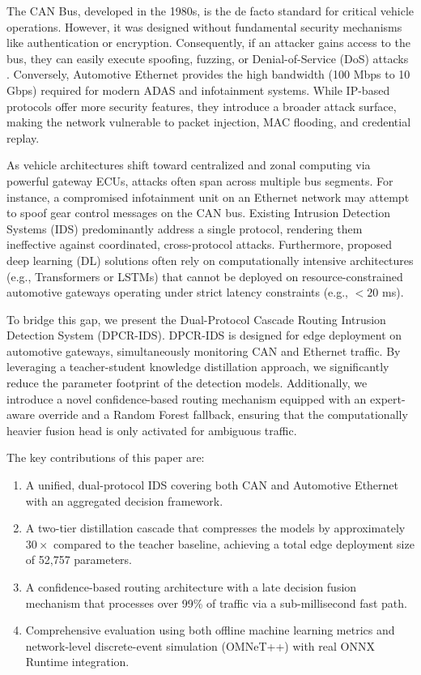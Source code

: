 \documentclass[conference]{IEEEtran}
\begin{document}
The CAN Bus, developed in the 1980s, is the de facto standard for critical vehicle operations. However, it was designed without fundamental security mechanisms like authentication or encryption. Consequently, if an attacker gains access to the bus, they can easily execute spoofing, fuzzing, or Denial-of-Service (DoS) attacks \cite{can_sec}. Conversely, Automotive Ethernet provides the high bandwidth (100 Mbps to 10 Gbps) required for modern ADAS and infotainment systems. While IP-based protocols offer more security features, they introduce a broader attack surface, making the network vulnerable to packet injection, MAC flooding, and credential replay.

As vehicle architectures shift toward centralized and zonal computing via powerful gateway ECUs, attacks often span across multiple bus segments. For instance, a compromised infotainment unit on an Ethernet network may attempt to spoof gear control messages on the CAN bus. Existing Intrusion Detection Systems (IDS) predominantly address a single protocol, rendering them ineffective against coordinated, cross-protocol attacks. Furthermore, proposed deep learning (DL) solutions often rely on computationally intensive architectures (e.g., Transformers or LSTMs) that cannot be deployed on resource-constrained automotive gateways operating under strict latency constraints (e.g., $<20$ ms).

To bridge this gap, we present the Dual-Protocol Cascade Routing Intrusion Detection System (DPCR-IDS). DPCR-IDS is designed for edge deployment on automotive gateways, simultaneously monitoring CAN and Ethernet traffic. By leveraging a teacher-student knowledge distillation approach, we significantly reduce the parameter footprint of the detection models. Additionally, we introduce a novel confidence-based routing mechanism equipped with an expert-aware override and a Random Forest fallback, ensuring that the computationally heavier fusion head is only activated for ambiguous traffic.

The key contributions of this paper are:
\begin{enumerate}
    \item A unified, dual-protocol IDS covering both CAN and Automotive Ethernet with an aggregated decision framework.
    \item A two-tier distillation cascade that compresses the models by approximately $30\times$ compared to the teacher baseline, achieving a total edge deployment size of 52,757 parameters.
    \item A confidence-based routing architecture with a late decision fusion mechanism that processes over 99\% of traffic via a sub-millisecond fast path.
    \item Comprehensive evaluation using both offline machine learning metrics and network-level discrete-event simulation (OMNeT++) with real ONNX Runtime integration.
\end{enumerate}
\end{document}
